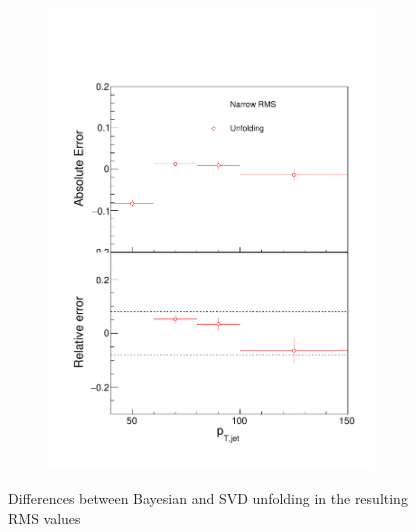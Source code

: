 \begin{figure}
\begin{subfigure}{0.24\textwidth}
\includegraphics[width=0.95\textwidth]{results/SystematicErrors/SystematicErrorsGausRMS_UnfNFin00JetPt08_linx_data}
\end{subfigure}
\caption{Differences between Bayesian and SVD unfolding in the resulting RMS values}
\label{fig:systunf}
\end{figure}

  
